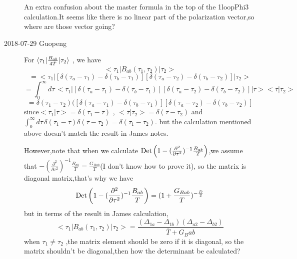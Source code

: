 \begin{description}
An extra confusion about the master formula in the top of the 1loopPhi3  calculation.It seems like there is no linear part
of the polarization vector,so where are those vector going?

\item[2018-07-29 Guopeng]
For $\bra{\tau_1}\frac{B_{ab}}{4\bar{T}}\ket{\tau_2}$ , we have 
\[
<\tau_1|B_{ab}(\tau_1,\tau_2)|\tau_2>
\]
\[=<\tau_1|[\delta(\tau_a-\tau_1)-\delta(\tau_b-\tau_1)][\delta(\tau_a-\tau_2)-\delta(\tau_b-\tau_2)]|\tau_2>
\]
\[
=\int_0^\infty \! d\tau \,<\tau_1|[\delta(\tau_a-\tau_1)-\delta(\tau_b-\tau_1)][\delta(\tau_a-\tau_2)-\delta(\tau_b-\tau_2)]|\tau><\tau|\tau_2>
\]
\[
=\delta(\tau_1-\tau_2)([\delta(\tau_a-\tau_1)-\delta(\tau_b-\tau_1)][\delta(\tau_a-\tau_2)-\delta(\tau_b-\tau_2)]
\]
since$<\tau_1|\tau>=\delta(\tau_1-\tau)$ , $<\tau|\tau_2>=\delta(\tau-\tau_2)$ and$ \int_0^\infty \! d\tau \,\delta(\tau_1-\tau)\delta(\tau-\tau_2)=\delta(\tau_1-\tau_2)$.
but the calculation mentioned above doesn't match the result in James notes.

However,note that when we calculate $\mbox{\rm Det}\,\!\left(1-(\frac{\partial^2}{\partial\tau^2})^{-1}\frac{B_{ab}}{T}\right)$,we assume that $-(\frac{\partial^2}{\partial\tau^2})^{-1}\frac{B_{ab}}{T}=\frac{G_{Bab}}{T}$(I don't know how to prove it),
so the matrix is diagonal matrix,that's why we have
\[
\mbox{\rm Det}\,\!\left(1-(\frac{\partial^2}{\partial\tau^2})^{-1}\frac{B_{ab}}{T}\right)=(1+\frac{G_{Bab}}{T})^{-\frac{D}{2}}
\]
but in terms of the result in James calculation, 
\[
<\tau_1|B_{ab}(\tau_1,\tau_2)|\tau_2>=\frac{(\Delta_{1a}-\Delta_{1b})(\Delta_{a2}-\Delta_{b2})}{\bar{T}+G_Bab}
\]
when $\tau_1\neq\tau_2$ ,the matrix element should be zero if it is diagonal, so the matrix shouldn't be diagonal,then how the determinant be calculated?








\end{description}

\printbibliography[heading=subbibintoc,title={References}]


\renewcommand{\ssp}{a}
